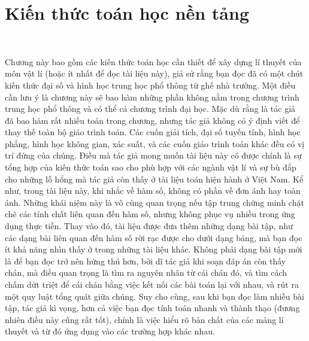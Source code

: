 \chapter{Kiến thức toán học nền tảng}

\ %

Chương này bao gồm các kiến thức toán học cần thiết để xây dựng lí thuyết của môn vật lí (hoặc ít nhất để đọc tài liệu này), giả sử rằng bạn đọc đã có một chút kiến thức đại số và hình học trung học phổ thông từ ghế nhà trường. Một điều cần lưu ý là chương này sẽ bao hàm những phần không nằm trong chương trình trung học phổ thông và có thể cả chương trình đại học. Mặc dù rằng là tác giả đã bao hàm rất nhiều toán trong chương, nhưng tác giả không có ý định viết để thay thế toàn bộ giáo trình toán. Các cuốn giải tích, đại số tuyến tính, hình học phẳng, hình học không gian, xác suất, và các cuốn giáo trình toán khác đều có vị trí đứng của chúng. Điều mà tác giả mong muốn tài liệu này có được chính là sự tổng hợp của kiến thức toán sao cho phù hợp với các ngành vật lí và sự bù đắp cho những lỗ hổng mà tác giả còn thấy ở tài liệu toán hiện hành ở Việt Nam. Kể như, trong tài liệu này, khi nhắc về hàm số, không có phần về đơn ánh hay toàn ánh. Những khái niệm này là vô cùng quan trọng nếu tập trung chứng minh chặt chẽ các tính chất liên quan đến hàm số, nhưng không phục vụ nhiều trong ứng dụng thực tiễn. Thay vào đó, tài liệu được đưa thêm những dạng bài tập, như các dạng bài liên quan đến hàm số rời rạc được cho dưới dạng bảng, mà bạn đọc ít khả năng nhìn thấy ở trong những tài liệu khác. Không phải dạng bài tập mới là để bạn đọc trở nên hứng thú hơn, bởi dĩ tác giả khi soạn đáp án còn thấy chán, mà điều quan trọng là tìm ra nguyên nhân từ cái chán đó, và tìm cách chấm dứt triệt để cái chán bằng việc kết nối các bài toán lại với nhau, và rút ra một quy luật tổng quát giữa chúng. Suy cho cùng, sau khi bạn đọc làm nhiều bài tập, tác giả kì vọng, hơn cả việc bạn đọc tính toán nhanh và thành thạo (đương nhiên điều này cũng rất tốt), chính là việc hiểu rõ bản chất của các mảng lí thuyết và từ đó ứng dụng vào các trường hợp khác nhau.

